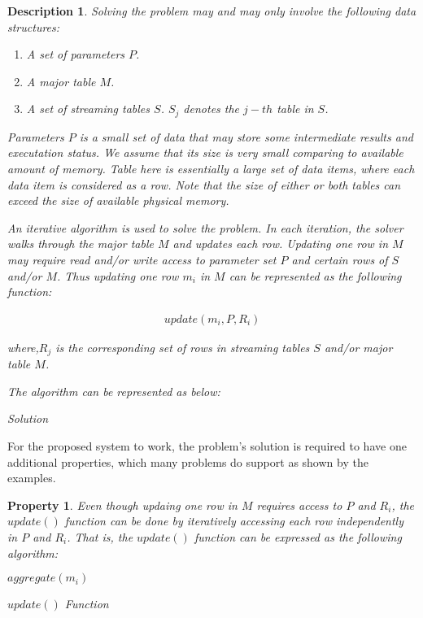 \documentclass[10pt, twocolumn, a4paper]{article}
\newtheorem{descrp}{Description}
\newtheorem{property}{Property}
\begin{document}
\begin{descrp}
Solving the problem may and may only involve the following data structures:

\begin{enumerate}
\item A set of parameters $P$. 
\item A major table $M$.
\item A set of streaming tables $S$. $S_j$ denotes the $j-th$ table in $S$.
\end{enumerate} 
Parameters $P$ is a small set of data that may store some intermediate results and executation status. We assume that its size is very small comparing to available amount of memory. Table here is essentially a large set of data items, where each data item is considered as a row. Note that the size of either or both tables can exceed the size of available physical memory.

An iterative algorithm is used to solve the problem. In each iteration, the solver walks through the major table $M$ and updates each row. Updating one row in $M$ may require read and/or write access to parameter set $P$ and certain rows of $S$ and/or $M$. Thus updating one row $m_i$ in $M$ can be represented as the following function:

\begin{align*}
update(m_i, P, R_i)
\end{align*}

where,$R_j$ is the corresponding set of rows in streaming tables $S$ and/or major table $M$.

The algorithm can be represented as below:

\begin{algorithm}[H]
\caption{Solution\label{IR}}
\end{algorithm}

\end{descrp}

For the proposed system to work, the problem's solution is required to have one additional properties, which many problems do support as shown by the examples.

\begin{property}
Even though updaing one row in $M$ requires access to $P$ and $R_i$, the $update()$ function can be done by iteratively accessing each row independently in $P$ and $R_i$. That is, the $update()$ function can be expressed as the following algorithm:

\begin{algorithm}
  $aggregate(m_i)$
\caption{$update()$ Function}
\end{algorithm}
\end{property}
\end{document}
